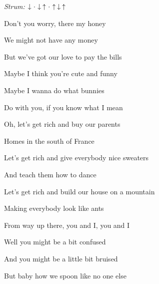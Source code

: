 \begin{song}


\begin{headerbox}
\textit{Strum:} $\Down\Miss\Down\Up\Miss\Up\Down\Up$
\end{headerbox}

\begin{hchordbox}
\end{hchordbox}

\Large

\bigskip

\Intro {}

\bigskip

Don't you worry, there my honey \par
{}We might not have any money \par
{}But we've got our love to pay the bills \par

\bigskip

Maybe I think you're cute and funny \par
{}Maybe I wanna do what bunnies \par
{}Do with you, if you know what I mean \par

\bigskip

\begin{chorusboxwide}{\Chorus}
Oh, let's get rich and buy our parents \par
{}Homes in the south of France \par
Let's get rich and give everybody nice sweaters \par
And teach them how to dance \par
Let's get rich and build our house on a mountain \par
Making everybody look like ants \par
From way up there, you and I, you and I \par
\end{chorusboxwide}

\bigskip

Well you might be a bit confused \par
And you might be a little bit bruised \par
But baby how we spoon like no one else \par


\end{song}
